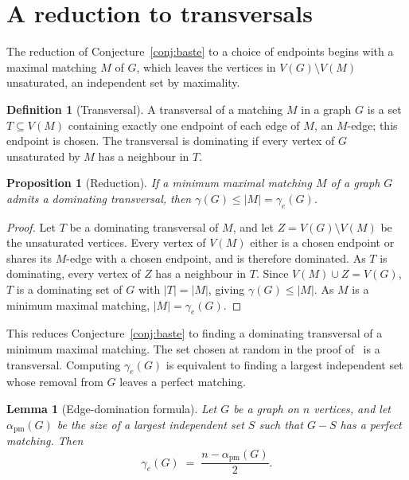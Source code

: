 \documentclass[11pt]{article}
\newtheorem{proposition}{Proposition}
\newtheorem{lemma}{Lemma}
\theoremstyle{definition}
\newtheorem{definition}{Definition}
\theoremstyle{remark}
\newcommand{\edom}{\gamma_{e}}
\newcommand{\alphapm}{\alpha_{\mathrm{pm}}}
\begin{document}
\section{A reduction to transversals}\label{sec:reduction}

The reduction of Conjecture~\ref{conj:baste} to a choice of endpoints begins with
a maximal matching $M$ of $G$, which leaves the vertices in $V(G) \setminus V(M)$
unsaturated, an independent set by maximality.

\begin{definition}[Transversal]\label{def:transversal}
A transversal of a matching $M$ in a graph $G$ is a set $T \subseteq V(M)$
containing exactly one endpoint of each edge of $M$, an $M$-edge; this
endpoint is chosen.
The transversal is dominating if every vertex of $G$ unsaturated by $M$ has a neighbour
in $T$.
\end{definition}

\begin{proposition}[Reduction]\label{prop:reduction}
If a minimum maximal matching $M$ of a graph $G$ admits a dominating
transversal, then $\gamma(G) \le |M| = \edom(G)$.
\end{proposition}

\begin{proof}
Let $T$ be a dominating transversal of $M$, and let $Z = V(G) \setminus V(M)$ be
the unsaturated vertices. Every vertex of $V(M)$ either is a chosen endpoint or shares
its $M$-edge with a chosen endpoint, and is therefore dominated. As $T$ is dominating, every vertex of $Z$
has a neighbour in $T$. Since $V(M) \cup Z = V(G)$, $T$ is a dominating set of $G$ with
$|T| = |M|$, giving $\gamma(G) \le |M|$. As $M$ is a minimum maximal matching,
$|M| = \edom(G)$.
\end{proof}

\noindent
This reduces Conjecture~\ref{conj:baste} to finding a dominating transversal of a
minimum maximal matching. The set chosen at random in the proof
of~\cite[Theorem~1]{Baste2020} is a transversal. Computing $\edom(G)$ is equivalent to finding a largest independent set whose removal from $G$ leaves a perfect matching.

\begin{lemma}[Edge-domination formula]\label{lem:alphapm}
Let $G$ be a graph on $n$ vertices, and let $\alphapm(G)$ be the size of a largest
independent set $S$ such that $G - S$ has a perfect matching. Then
\[
  \edom(G) \;=\; \frac{n - \alphapm(G)}{2}.
\]
\end{lemma}
\end{document}
